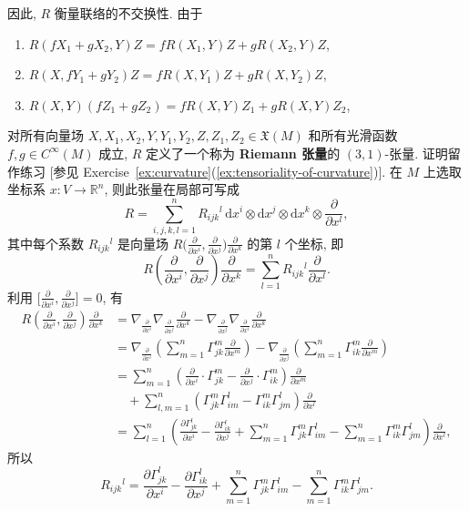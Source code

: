 因此, $R$ 衡量联络的不交换性. 由于
\begin{enumerate}[label=(\roman*),leftmargin=*]
\item $R(fX_1+gX_2,Y)Z=fR(X_1,Y)Z+gR(X_2,Y)Z$,
\item $R(X,fY_1+gY_2)Z=fR(X,Y_1)Z+gR(X,Y_2)Z$,
\item $R(X,Y)(fZ_1+gZ_2)=fR(X,Y)Z_1+gR(X,Y)Z_2$,
\end{enumerate}
对所有向量场 $X,X_1,X_2,Y,Y_1,Y_2,Z,Z_1,Z_2\in\mathfrak{X}(M)$ 和所有光滑函数 $f,g\in C^\infty(M)$ 成立, $R$ 定义了一个称为 \textbf{Riemann 张量}的 $(3,1)$-张量. 证明留作练习 [参见 Exercise~\ref{ex:curvature}(\ref{ex:tensoriality-of-curvature})]. 在 $M$ 上选取坐标系 $x:V\to\mathbb{R}^n$, 则此张量在局部可写成
\[
  R=\sum_{i,j,k,l=1}^n R_{ijk}{}^l\,\mathrm{d}x^i\otimes\mathrm{d}x^j
  \otimes\mathrm{d}x^k\otimes\frac{\partial}{\partial x^l},
\]
其中每个系数 $R_{ijk}{}^l$ 是向量场 $R\bigl(\frac{\partial}{\partial x^i},\frac{\partial}{\partial x^j}\bigr)\frac{\partial}{\partial x^k}$ 的第 $l$ 个坐标, 即
\[
  R\left(\frac{\partial}{\partial x^i},\frac{\partial}{\partial x^j}\right)
  \frac{\partial}{\partial x^k}=\sum_{l=1}^n R_{ijk}{}^l\frac{\partial}{\partial x^l}.
\]
利用 $\bigl[\frac{\partial}{\partial x^i},\frac{\partial}{\partial x^j}\bigr]=0$, 有
\begin{align*}
  R\left(\frac{\partial}{\partial x^i},\frac{\partial}{\partial x^j}\right)
  \frac{\partial}{\partial x^k}
  &=\nabla_{\frac{\partial}{\partial x^i}}\nabla_{\frac{\partial}{\partial x^j}}
    \frac{\partial}{\partial x^k}
  -\nabla_{\frac{\partial}{\partial x^j}}\nabla_{\frac{\partial}{\partial x^i}}
    \frac{\partial}{\partial x^k}\\
  &=\nabla_{\frac{\partial}{\partial x^i}}
    \left(\sum_{m=1}^n\Gamma_{jk}^m\frac{\partial}{\partial x^m}\right)
   -\nabla_{\frac{\partial}{\partial x^j}}
    \left(\sum_{m=1}^n\Gamma_{ik}^m\frac{\partial}{\partial x^m}\right)\\
  &=\sum_{m=1}^n\left(\frac{\partial}{\partial x^i}\cdot\Gamma_{jk}^m
    -\frac{\partial}{\partial x^j}\cdot\Gamma_{ik}^m\right)\frac{\partial}{\partial x^m}\\
  &\quad+\sum_{l,m=1}^n(\Gamma_{jk}^m\Gamma_{im}^l-\Gamma_{ik}^m\Gamma_{jm}^l)
    \frac{\partial}{\partial x^l}\\
  &=\sum_{l=1}^n\left(\frac{\partial\Gamma_{jk}^l}{\partial x^i}
    -\frac{\partial\Gamma_{ik}^l}{\partial x^j}
    +\sum_{m=1}^n\Gamma_{jk}^m\Gamma_{im}^l
    -\sum_{m=1}^n\Gamma_{ik}^m\Gamma_{jm}^l\right)\frac{\partial}{\partial x^l},
\end{align*}
所以
\[
  R_{ijk}{}^l=\frac{\partial\Gamma_{jk}^l}{\partial x^i}
  -\frac{\partial\Gamma_{ik}^l}{\partial x^j}
  +\sum_{m=1}^n\Gamma_{jk}^m\Gamma_{im}^l-\sum_{m=1}^n\Gamma_{ik}^m\Gamma_{jm}^l.
\]

